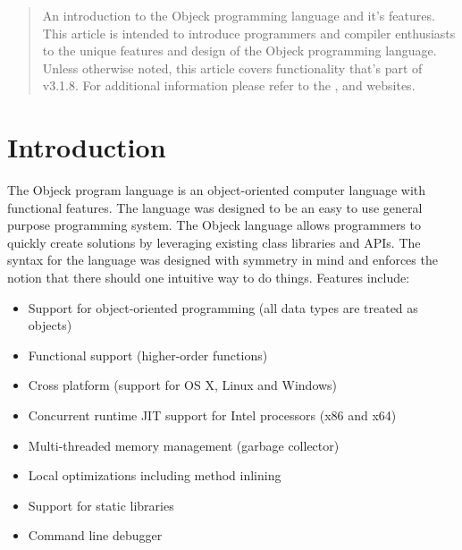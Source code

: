 \documentclass[11pt]{article}
\begin{document}
\maketitle
\thispagestyle{empty}

\vspace{\baselineskip}

\begin{abstract}
  An introduction to the Objeck programming language and it's
  features.  This article is intended to introduce programmers and
  compiler enthusiasts to the unique features and design of the Objeck
  programming language.  Unless otherwise noted, this article covers
  functionality that's part of v3.1.8.  For additional information
  please refer to the
  ,
  and
  websites.
\end{abstract}

\newpage
\tableofcontents
\newpage

\label{Introduction}
\section{Introduction}
The Objeck program language is an object-oriented computer language
with functional features.  The language was designed to be an easy to
use general purpose programming system.  The Objeck language allows
programmers to quickly create solutions by leveraging existing class
libraries and APIs.  The syntax for the language was designed with
symmetry in mind and enforces the notion that there should one
intuitive way to do things. Features include:
\begin{itemize}
\item Support for object-oriented programming (all data types are
  treated as objects)
\item Functional support (higher-order functions)
\item Cross platform (support for OS X, Linux and Windows)
\item Concurrent runtime JIT support for Intel processors (x86 and
  x64)
\item Multi-threaded memory management (garbage collector)
\item Local optimizations including method inlining
\item Support for static libraries
\item Command line debugger
\end{itemize}
\end{document}

